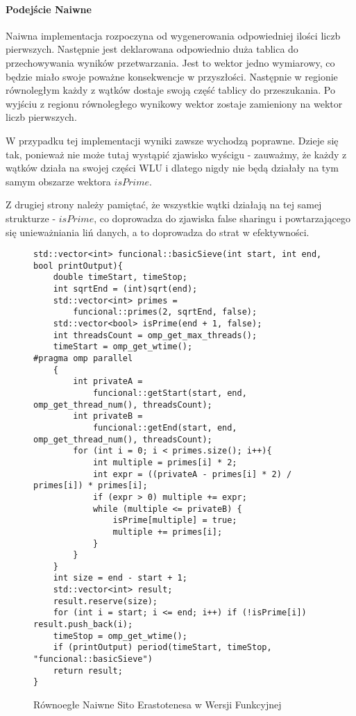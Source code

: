 \documentclass{article}
\begin{document}
                    \paragraph{Podejście Naiwne}
                        Naiwna implementacja rozpoczyna od wygenerowania odpowiedniej ilości liczb pierwszych. Następnie jest deklarowana odpowiednio duża tablica do przechowywania wyników przetwarzania. Jest to wektor jedno wymiarowy, co będzie miało swoje poważne konsekwencje w przyszłości. Następnie w regionie równoległym każdy z wątków dostaje swoją część tablicy do przeszukania. Po wyjściu z regionu równoległego wynikowy wektor zostaje zamieniony na wektor liczb pierwszych.
                        
                        W przypadku tej implementacji wyniki zawsze wychodzą poprawne. Dzieje się tak, ponieważ nie może tutaj wystąpić zjawisko wyścigu - zauważmy, że każdy z wątków działa na swojej części \gls{WLU} i dlatego nigdy nie będą działały na tym samym obszarze wektora $isPrime$.
                        
                        Z drugiej strony należy pamiętać, że wszystkie wątki działają na tej samej strukturze - $isPrime$, co doprowadza do zjawiska false sharingu i powtarzającego się unieważniania liń danych, a to doprowadza do strat w efektywności.
                        \begin{figure}
                            \begin{verbatim}
std::vector<int> funcional::basicSieve(int start, int end, bool printOutput){
    double timeStart, timeStop;
    int sqrtEnd = (int)sqrt(end);
    std::vector<int> primes = 
        funcional::primes(2, sqrtEnd, false);
    std::vector<bool> isPrime(end + 1, false);
    int threadsCount = omp_get_max_threads();
    timeStart = omp_get_wtime();
#pragma omp parallel 
    {
        int privateA = 
            funcional::getStart(start, end, omp_get_thread_num(), threadsCount);
        int privateB = 
            funcional::getEnd(start, end, omp_get_thread_num(), threadsCount);
        for (int i = 0; i < primes.size(); i++){
            int multiple = primes[i] * 2;
            int expr = ((privateA - primes[i] * 2) / primes[i]) * primes[i];
            if (expr > 0) multiple += expr;
            while (multiple <= privateB) {
                isPrime[multiple] = true;
                multiple += primes[i];
            }
        }
    }
    int size = end - start + 1;
    std::vector<int> result;
    result.reserve(size);
    for (int i = start; i <= end; i++) if (!isPrime[i]) result.push_back(i);
    timeStop = omp_get_wtime();
    if (printOutput) period(timeStart, timeStop, "funcional::basicSieve")
    return result;
}
                            \end{verbatim}
                            \caption{Równoegłe Naiwne Sito Erastotenesa w Wersji Funkcyjnej}
                        \end{figure}
                        
\end{document}
